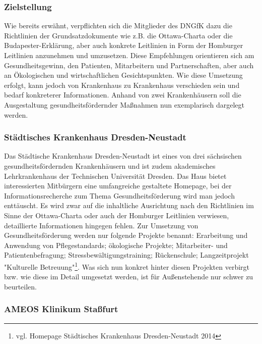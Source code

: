 \subsubsection{Zielstellung}
\label{sec:Zielstellung}

Wie bereits erwähnt, verpflichten sich die Mitglieder des DNGfK dazu die Richtlinien der Grundsatzdokumente wie z.B. die Ottawa-Charta oder die Budapester-Erklärung, aber auch konkrete Leitlinien in Form der Homburger Leitlinien anzunehmen und umzusetzen. Diese Empfehlungen orientieren sich am Gesundheitsgewinn, den  Patienten,  Mitarbeitern und Partnerschaften, aber auch an Ökologischen und wirtschaftlichen Gesichtspunkten. Wie diese Umsetzung erfolgt, kann jedoch von Krankenhaus zu Krankenhaus verschieden sein und bedarf konkreterer Informationen. Anhand von zwei Krankenhäusern soll die Ausgestaltung gesundheitsfördernder Maßnahmen nun exemplarisch dargelegt werden. 

\subsubsection{Städtisches Krankenhaus Dresden-Neustadt}
\label{sec:StädtischesKrankenhausDresdenNeustadt}

Das Städtische Krankenhaus Dresden-Neustadt ist eines von drei sächsischen gesundheitsfördernden Krankenhäusern und ist zudem akademisches Lehrkrankenhaus der Technischen Universität Dresden. Das Haus bietet interessierten Mitbürgern eine umfangreiche gestaltete Homepage, bei der Informationsrecherche zum Thema Gesundheitsförderung wird man jedoch enttäuscht. Es wird zwar auf die inhaltliche Ausrichtung nach den Richtlinien im Sinne der Ottawa-Charta oder auch der Homburger Leitlinien verwiesen, detaillierte Informationen hingegen fehlen. Zur Umsetzung von Gesundheitsförderung werden nur folgende Projekte benannt: Erarbeitung und Anwendung von Pflegestandards; ökologische Projekte; Mitarbeiter- und Patientenbefragung; Stressbewältigungstraining; Rückenschule; Langzeitprojekt "Kulturelle Betreuung"\footnote{vgl. Homepage Städtisches Krankenhaus Dresden-Neustadt 2014}. Was sich nun konkret hinter diesen Projekten verbirgt bzw. wie diese im Detail umgesetzt werden, ist für Außenstehende nur schwer zu beurteilen. 

\subsubsection{AMEOS Klinikum Staßfurt}
\label{sec:AMEOSKlinikumStassfurt}

